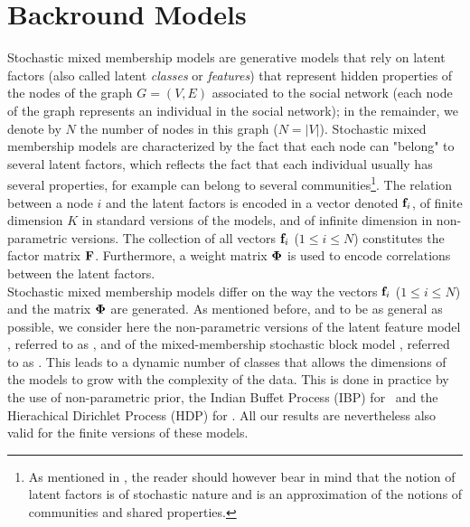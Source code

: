 
\section{Backround Models}
\label{sec:background}

Stochastic mixed membership models are generative models that rely on latent factors (also called latent \textit{classes} or \textit{features}) that represent hidden properties of the nodes of the graph $G=(V,E)$ associated to the social network (each node of the graph represents an individual in the social network); in the remainder, we denote by $N$ the number of nodes in this graph ($N=|V|$). Stochastic mixed membership models are characterized by the fact that each node can "belong" to several latent factors, which reflects the fact that each individual usually has several properties, for example can belong to several communities\footnote{As mentioned in \cite{goldenberg2010survey}, the reader should however bear in mind that the notion of latent factors is of stochastic nature and is an approximation of the notions of communities and shared properties.}. The relation between a node $i$ and the latent factors is encoded in a vector denoted $\mathbf{f}_{i}$, of finite dimension $K$ in standard versions of the models, and of infinite dimension in  non-parametric versions. The collection of all vectors $\mathbf{f}_{i}$ ($1 \le i \le N$) constitutes the factor matrix $\mathbf{F}$. Furthermore, a weight matrix $\mathbf{\Phi}$ is used to encode correlations between the latent factors.~\\

Stochastic mixed membership models differ on the way the vectors $\mathbf{f}_{i}$ ($1 \le i \le N$) and the matrix $\mathbf{\Phi}$ are generated. As mentioned before, and to be as general as possible, we consider here the non-parametric versions of the latent feature model \cite{ILFRM}, referred to as \ifm, and of the mixed-membership stochastic block model \cite{iMMSB,fan2015dynamic}, referred to as \imb. This leads to a dynamic number of classes that allows the dimensions of the models to grow with the complexity of the data. This is done in practice by the use of non-parametric prior,  the Indian Buffet Process (IBP) for \ifm\ and the Hierachical Dirichlet Process (HDP)  for \imb. All our results are nevertheless also valid for the finite versions of these models.~\\

